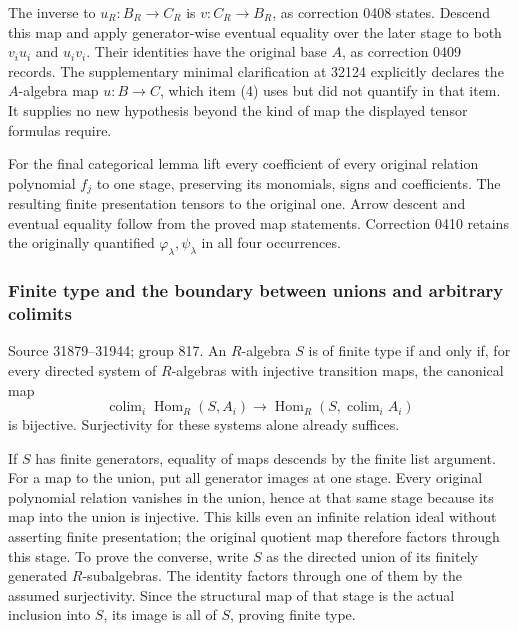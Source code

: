 The inverse to \(u_R:B_R\to C_R\) is \(v:C_R\to B_R\), as correction 0408 states. Descend this map and apply generator-wise eventual equality over the later stage to both \(v_i u_i\) and \(u_i v_i\). Their identities have the original base \(A\), as correction 0409 records. The supplementary minimal clarification at 32124 explicitly declares the \(A\)-algebra map \(u:B\to C\), which item (4) uses but did not quantify in that item. It supplies no new hypothesis beyond the kind of map the displayed tensor formulas require.

For the final categorical lemma lift every coefficient of every original relation polynomial \(f_j\) to one stage, preserving its monomials, signs and coefficients. The resulting finite presentation tensors to the original one. Arrow descent and eventual equality follow from the proved map statements. Correction 0410 retains the originally quantified \(\varphi_\lambda,\psi_\lambda\) in all four occurrences.

\subsubsection{Finite type and the boundary between unions and arbitrary colimits}\label{algebra-proof-036-finite-type-and-the-boundary-between-unions-and-arbitrary-colimits}

Source 31879--31944; group 817. An \(R\)-algebra \(S\) is of finite type if and only if, for every directed system of \(R\)-algebras with injective transition maps, the canonical map \[
\operatorname{colim}_i\operatorname{Hom}_R(S,A_i)
\longrightarrow\operatorname{Hom}_R(S,\operatorname{colim}_i A_i)
\] is bijective. Surjectivity for these systems alone already suffices.

If \(S\) has finite generators, equality of maps descends by the finite list argument. For a map to the union, put all generator images at one stage. Every original polynomial relation vanishes in the union, hence at that same stage because its map into the union is injective. This kills even an infinite relation ideal without asserting finite presentation; the original quotient map therefore factors through this stage. To prove the converse, write \(S\) as the directed union of its finitely generated \(R\)-subalgebras. The identity factors through one of them by the assumed surjectivity. Since the structural map of that stage is the actual inclusion into \(S\), its image is all of \(S\), proving finite type.

